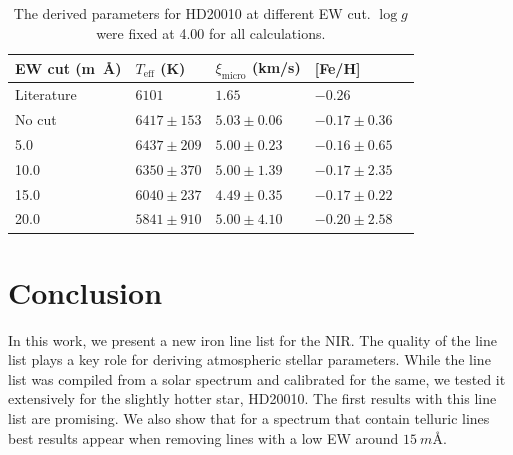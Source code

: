 \documentclass{aa}
\begin{document}
\begin{table}[htb!]
    \caption{The derived parameters for HD20010 at different EW cut. $\log g$
        were fixed at 4.00 for all calculations.}
    \label{tab:hd20010}
    \centering
    \begin{tabular}{lllll}
      \hline\hline
        EW cut (\si{m\angstrom}) & $T_\mathrm{eff}$ (K) & $\xi_\mathrm{micro}$ (km/s) & [Fe/H]             \\
      \hline
        Literature               & $6101        $       & $1.65         $             & $-0.26         $   \\
      \hline
        No cut                   & $6417 \pm 153$       & $5.03 \pm 0.06$             & $-0.17 \pm 0.36$   \\
        5.0                      & $6437 \pm 209$       & $5.00 \pm 0.23$             & $-0.16 \pm 0.65$   \\
       10.0                      & $6350 \pm 370$       & $5.00 \pm 1.39$             & $-0.17 \pm 2.35$   \\
       15.0                      & $6040 \pm 237$       & $4.49 \pm 0.35$             & $-0.17 \pm 0.22$   \\
       20.0                      & $5841 \pm 910$       & $5.00 \pm 4.10$             & $-0.20 \pm 2.58$   \\
      \hline
    \end{tabular}
\end{table}







\section{Conclusion}

In this work, we present a new iron line list for the NIR. The quality
of the line list plays a key role for deriving atmospheric stellar
parameters. While the line list was compiled from a solar spectrum and
calibrated for the same, we tested it extensively for the slightly
hotter star, HD20010. The first results with this line list are
promising. We also show that for a spectrum that contain telluric
lines best results appear when removing lines with a low EW around
$\SI{15}{m\angstrom}$.
\end{document}

